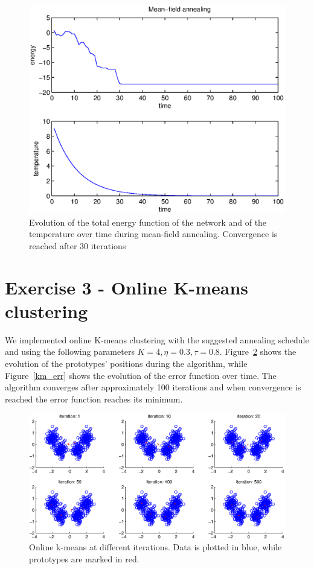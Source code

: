 \documentclass[a4paper,english]{article}
\begin{document}
\begin{figure}[h!]
\centering
\includegraphics[scale = .7]{ex2_mean_fields_et.eps}
\caption{Evolution of the total energy function of the network and of the temperature over time during mean-field annealing. Convergence is reached after 30 iterations}
\label{mf_et}
\end{figure}

\clearpage
\section*{Exercise 3 - Online K-means clustering}
We implemented online K-means clustering with the suggested annealing schedule and using the following parameters $K  = 4, \eta  = 0.3, \tau = 0.8$.
Figure~\ref{km_steps} shows the evolution of the prototypes' positions during the algorithm, while Figure~\ref{km_err} shows the evolution of the error function over time.
The algorithm converges after approximately 100 iterations and when convergence is reached the error function reaches its minimum.

\begin{figure}[h!]
\centering
\includegraphics[scale = 0.8]{ex3_kmeans_steps}
\caption{Online k-means at different iterations. Data is plotted in blue, while prototypes are marked in red.}
\label{km_steps}
\end{figure}
\end{document}
